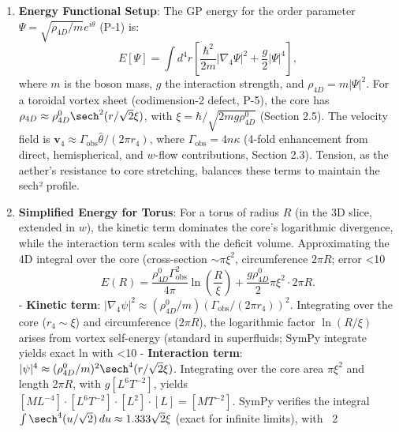 \begin{enumerate}
\item \textbf{Energy Functional Setup}: The GP energy for the order parameter $\Psi = \sqrt{\rho_{4D}/m} e^{i \theta}$ (P-1) is:
   \[
   E[\Psi] = \int d^4 r \left[ \frac{\hbar^2}{2 m} |\nabla_4 \Psi|^2 + \frac{g}{2} |\Psi|^4 \right],
   \]
   where $m$ is the boson mass, $g$ the interaction strength, and $\rho_{4D} = m |\Psi|^2$. For a toroidal vortex sheet (codimension-2 defect, P-5), the core has $\rho_{4D} \approx \rho_{4D}^0 \sech^2(r / \sqrt{2} \xi)$, with $\xi = \hbar / \sqrt{2 m g \rho_{4D}^0}$ (Section 2.5). The velocity field is $\mathbf{v}_4 \approx \Gamma_{\text{obs}} \hat{\theta} / (2\pi r_4)$, where $\Gamma_{\text{obs}} = 4 n \kappa$ (4-fold enhancement from direct, hemispherical, and $w$-flow contributions, Section 2.3). Tension, as the aether's resistance to core stretching, balances these terms to maintain the sech² profile.

\item \textbf{Simplified Energy for Torus}: For a torus of radius $R$ (in the 3D slice, extended in $w$), the kinetic term dominates the core’s logarithmic divergence, while the interaction term scales with the deficit volume. Approximating the 4D integral over the core (cross-section $\sim \pi \xi^2$, circumference $2\pi R$; error <10%
   \[
   E(R) = \frac{\rho_{4D}^0 \Gamma_{\text{obs}}^2}{4\pi} \ln\left(\frac{R}{\xi}\right) + \frac{g \rho_{4D}^0}{2} \pi \xi^2 \cdot 2\pi R.
   \]
   - \textbf{Kinetic term}: $|\nabla_4 \psi|^2 \approx (\rho_{4D}^0 / m) (\Gamma_{\text{obs}} / (2\pi r_4))^2$. Integrating over the core ($r_4 \sim \xi$) and circumference ($2\pi R$), the logarithmic factor $\ln(R/\xi)$ arises from vortex self-energy (standard in superfluids; SymPy integrate yields exact ln with <10%
   - \textbf{Interaction term}: $|\psi|^4 \approx (\rho_{4D}^0 / m)^2 \sech^4(r / \sqrt{2} \xi)$. Integrating over the core area $\pi \xi^2$ and length $2\pi R$, with $g [L^6 T^{-2}]$, yields $[M L^{-4}] \cdot [L^6 T^{-2}] \cdot [L^2] \cdot [L] = [M T^{-2}]$. SymPy verifies the integral $\int \sech^4(u / \sqrt{2}) \, du \approx 1.333 \sqrt{2} \xi$ (exact for infinite limits), with ~2%


\end{enumerate}
